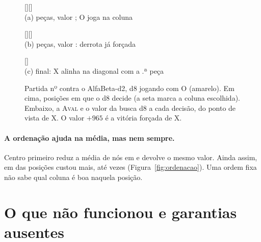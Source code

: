 \documentclass[11pt,a4paper]{article}
\newcommand{\fn}[1]{\textsc{#1}}            %
\begin{document}
\begin{figure}[H]
\centering
\begin{minipage}[b]{0.3\linewidth}\centering
  \tabuleiro{\tabZzAntes}[][\colZzAntes]\\[2pt]
  {\footnotesize (a)  peças, valor ; O joga na coluna \colZzAntes}
\end{minipage}\hfill
\begin{minipage}[b]{0.3\linewidth}\centering
  \tabuleiro{\tabZzPerdido}[][\colZzPerdido]\\[2pt]
  {\footnotesize (b)  peças, valor : derrota já forçada}
\end{minipage}\hfill
\begin{minipage}[b]{0.3\linewidth}\centering
  \tabuleiro{\tabZzFinal}[\tabZzFinalVence]\\[2pt]
  {\footnotesize (c) final: X alinha na diagonal com a .ª peça}
\end{minipage}

\medskip
\graficoZugzwang[height=4.6cm]
\caption{Partida nº  contra o AlfaBeta-d2, d8 jogando com O (amarelo). Em cima, posições em
que o d8 decide (a seta marca a coluna escolhida). Embaixo, a \fn{Aval} e o valor da busca d8 a cada decisão,
do ponto de vista de X. O valor $+965$ é a vitória forçada de X.}
\label{fig:zugzwang}
\end{figure}

\paragraph{A ordenação ajuda na média, mas nem sempre.} Centro primeiro reduz a média de nós em
 e devolve o mesmo valor. Ainda assim, em  das 
posições custou mais, até  vezes (Figura~\ref{fig:ordenacao}). Uma ordem fixa não sabe qual
coluna é boa naquela posição.

\section{O que não funcionou e garantias ausentes}
\label{sec:garantias}
\end{document}
